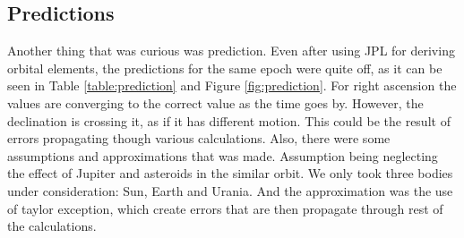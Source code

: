 \documentclass[a4paper,12pt]{article}
\begin{document}
\subsection{Predictions}
\label{sec:errorpridiction}
Another thing that was curious was prediction. Even after using JPL for deriving orbital elements, the predictions for the same epoch were quite off, as it can be seen in Table \ref{table:prediction} and Figure \ref{fig:prediction}. For right ascension the values are converging to the correct value as the time goes by. However, the declination is crossing it, as if it has different motion. This could be the result of errors propagating though various calculations. Also, there were some assumptions and approximations that was made. Assumption being neglecting the effect of Jupiter and asteroids in the similar orbit. We only took three bodies under consideration: Sun, Earth and Urania. And the approximation was the use of taylor exception, which create errors that are then propagate through rest of the calculations. 
\end{document}
